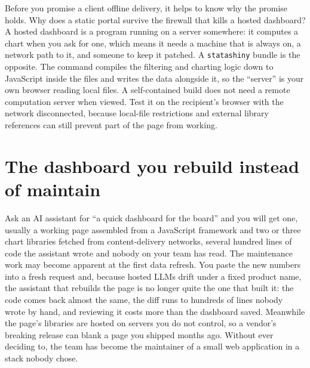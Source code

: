 Before you promise a client offline delivery, it helps to know why the promise holds. Why does a static portal survive the firewall that kills a hosted dashboard? A hosted dashboard is a program running on a server somewhere: it computes a chart when you ask for one, which means it needs a machine that is always on, a network path to it, and someone to keep it patched. A \texttt{statashiny} bundle is the opposite. The command compiles the filtering and charting logic down to JavaScript inside the files and writes the data alongside it, so the \enquote{server} is your own browser reading local files. A self-contained build does not need a remote computation server when viewed. Test it on the recipient's browser with the network disconnected, because local-file restrictions and external library references can still prevent part of the page from working.

\section{The dashboard you rebuild instead of maintain}\label{sec:dashboardbuilder}
Ask an AI assistant for \enquote{a quick dashboard for the board} and you will get one, usually a working page assembled from a JavaScript framework and two or three chart libraries fetched from content-delivery networks, several hundred lines of code the assistant wrote and nobody on your team has read. The maintenance work may become apparent at the first data refresh. You paste the new numbers into a fresh request and, because hosted LLMs drift under a fixed product name, the assistant that rebuilds the page is no longer quite the one that built it: the code comes back almost the same, the diff runs to hundreds of lines nobody wrote by hand, and reviewing it costs more than the dashboard saved. Meanwhile the page's libraries are hosted on servers you do not control, so a vendor's breaking release can blank a page you shipped months ago. Without ever deciding to, the team has become the maintainer of a small web application in a stack nobody chose.

